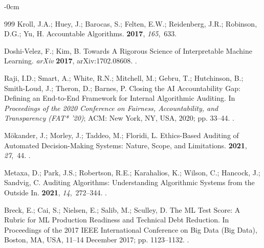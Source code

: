 \documentclass[systems,article,accept,moreauthors,pdftex]{Definitions/mdpi}
\begin{document}
\begin{adjustwidth}{-\extralength}{0cm}
\begin{thebibliography}{999}
Kroll, J.A.; Huey, J.; Barocas, S.; Felten, E.W.; Reidenberg, J.R.; Robinson,
  D.G.; Yu, H.
\newblock Accountable Algorithms.
 {\bf 2017}, {\em
  165},~633.

Doshi-Velez, F.; Kim, B.
\newblock Towards A Rigorous Science of Interpretable Machine Learning.
\newblock \emph{arXiv} \textbf{2017}, arXiv:1702.08608.
.

Raji, I.D.; Smart, A.; White, R.N.; Mitchell, M.; Gebru, T.; Hutchinson, B.;
  Smith-Loud, J.; Theron, D.; Barnes, P.
\newblock Closing the {AI} Accountability Gap: Defining an End-to-End Framework
  for Internal Algorithmic Auditing.
\newblock In \emph{Proceedings of the  2020 Conference on Fairness,
  Accountability, and Transparency (FAT* '20)}; ACM: New York, NY, USA,  2020; pp.
  33--44.
.

M{\"o}kander, J.; Morley, J.; Taddeo, M.; Floridi, L.
\newblock Ethics-Based Auditing of Automated Decision-Making Systems: Nature,
  Scope, and Limitations.
 {\bf 2021}, {\em 27},~44.
.

Metaxa, D.; Park, J.S.; Robertson, R.E.; Karahalios, K.; Wilson, C.; Hancock,
  J.; Sandvig, C.
\newblock Auditing Algorithms: Understanding Algorithmic Systems from the
  Outside In.
 {\bf
  2021}, {\em 14},~272--344.
.

Breck, E.; Cai, S.; Nielsen, E.; Salib, M.; Sculley, D.
\newblock The {ML} Test Score: A Rubric for {ML} Production Readiness and
  Technical Debt Reduction.
\newblock In Proceedings of the  2017 IEEE International
  Conference on Big Data (Big Data), Boston, MA, USA, 11--14 December 2017; pp. 1123--1132.
.


\end{thebibliography}
\end{adjustwidth}
\end{document}
